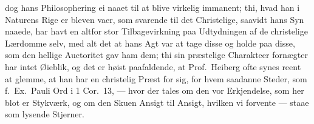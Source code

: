 \documentclass[12pt,a4paper]{book}
\newcommand{\apage}[1]{\marginnote{\footnotesize\textit{[#1]}}}
\begin{document}
dog hans Philosophering ei naaet til at blive virkelig \apage{28} immanent; thi, hvad
han i Naturens Rige er bleven vaer, som svarende til det Christelige, saavidt
hans Syn naaede, har havt en altfor stor Tilbagevirkning paa Udtydningen af
de christelige Lærdomme selv, med alt det at hans Agt var at tage disse og
holde paa disse, som den hellige Auctoritet gav ham dem; thi sin præstelige
Charakteer fornægter har intet Øieblik, og det er høist paafaldende, at
Prof.\ Heiberg ofte synes reent at glemme, at han har en christelig Præst for
sig, for hvem saadanne Steder, som f.\ Ex.\ Pauli Ord i 1 Cor.\ 13, ---
hvor der tales om den vor Erkjendelse, som her blot er Stykværk, og om den
Skuen Ansigt til Ansigt, hvilken vi forvente --- staae som lysende Stjerner.
\end{document}
